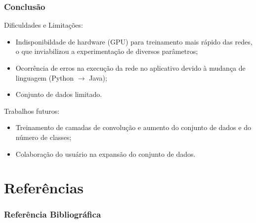 \documentclass{beamer}
\begin{document}
    \begin{frame}[t]
      \frametitle{Conclusão}
      Dificuldades e Limitações:
      \begin{itemize}
        \item<1-> Indisponibildade de hardware (GPU) para treinamento mais rápido das redes, o que inviabilizou 
        a experimentação de diversos parâmetros;
        \item<2-> Ocorrência de erros na execução da rede no aplicativo devido à mudança de linguagem (Python $\rightarrow${} Java);
	    \item<3-> Conjunto de dados limitado.  
      \end{itemize}
      
      \bigskip    
      {
      	Trabalhos futuros:
     	\begin{itemize}
        	\item<4-> Treinamento de camadas de convolução e aumento do conjunto de dados e do número de classes;
        	\item<5-> Colaboração do usuário na expansão do conjunto de dados.
      	\end{itemize}
      }
      
    \end{frame}
    
        
    \section{Referências}
    
    \begin{frame}[allowframebreaks]
      \frametitle{Referência Bibliográfica}
      
      
      
    \end{frame}
    
    
    
\end{document}
